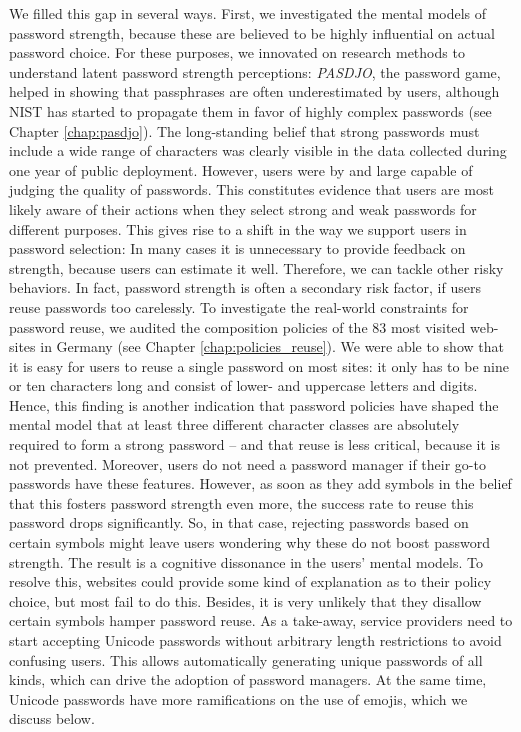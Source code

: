 We filled this gap in several ways. First, we investigated the mental models of password strength, because these are believed to be highly influential on actual password choice. For these purposes, we innovated on research methods to understand latent password strength perceptions: \textit{PASDJO}, the password game, helped in showing that passphrases are often underestimated by users, although \gls{NIST} has started to propagate them in favor of highly complex passwords (see Chapter \ref{chap:pasdjo}). The long-standing belief that strong passwords must include a wide range of characters was clearly visible in the data collected during one year of public deployment. However, users were by and large capable of judging the quality of passwords. This constitutes evidence that users are most likely aware of their actions when they  select strong and weak passwords for different purposes. This gives rise to a shift in the way we support users in password selection: In many cases it is unnecessary to provide feedback on strength, because users can estimate it well. Therefore, we can tackle other risky behaviors. 
In fact, password strength is often a secondary risk factor, if users reuse passwords too carelessly. To investigate the real-world constraints for password reuse, we audited the composition policies of the 83 most visited web-sites in Germany (see Chapter \ref{chap:policies_reuse}). We were able to show that it is easy for users to reuse a single password on most sites: it only has to be nine or ten characters long and consist of lower- and uppercase letters and digits. Hence, this finding is another indication that password policies have shaped the mental model that at least three different character classes are absolutely required to form a strong password -- and that reuse is less critical, because it is not prevented. Moreover, users do not need a password manager if their go-to passwords have these features. However, as soon as they add symbols in the belief that this fosters password strength even more, the success rate to reuse this password drops significantly. So, in that case, rejecting passwords based on certain symbols might leave users wondering why these do not boost password strength. The result is a cognitive dissonance in the users' mental models. To resolve this, websites could provide some kind of explanation as to their policy choice, but most fail to do this. Besides, it is very unlikely that they disallow certain symbols hamper password reuse. As a take-away, service providers need to start accepting Unicode passwords without arbitrary length restrictions to avoid confusing users. This allows automatically generating unique passwords of all kinds, which can drive the adoption of password managers. At the same time, Unicode passwords have more ramifications on the use of emojis, which we discuss below. 

